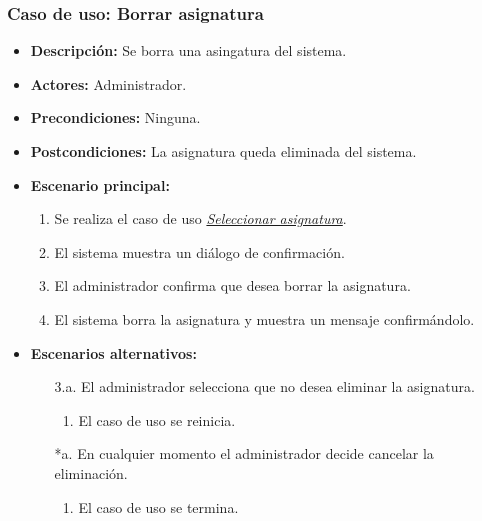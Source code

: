 \documentclass{book}
\begin{document}
\subsubsection*{Caso de uso: Borrar asignatura}
\begin{itemize}
\item{\bf Descripción:} Se borra una asingatura del sistema.
\item{\bf Actores:} Administrador.
\item{\bf Precondiciones:} Ninguna.
\item{\bf Postcondiciones:} La asignatura queda eliminada del sistema.
\item{\bf Escenario principal:}
	\begin{enumerate}
	\item Se realiza el caso de uso {\em \hyperref[select_asignatura]{Seleccionar asignatura}}.
	\item El sistema muestra un diálogo de confirmación.
	\item El administrador confirma que desea borrar la asignatura.
	\item El sistema borra la asignatura y muestra un mensaje confirmándolo.
	\end{enumerate}
\item{\bf Escenarios alternativos:}
	\begin{itemize}
	\item[3.a.] El administrador selecciona que no desea eliminar la asignatura.
		\begin{enumerate}
		\item El caso de uso se reinicia.
		\end{enumerate}
	\item[*a.] En cualquier momento el administrador decide cancelar la eliminación.
		\begin{enumerate}
		\item El caso de uso se termina.
		\end{enumerate}
	\end{itemize}
\end{itemize}
\end{document}
